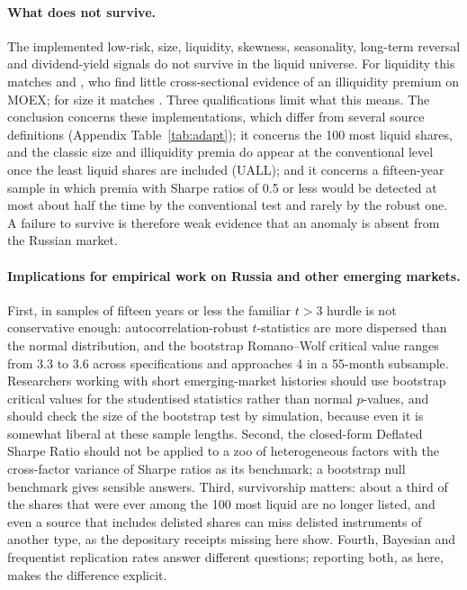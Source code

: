 \documentclass[11pt]{article}
\newcommand{\RW}{Romano--Wolf}
\begin{document}
\paragraph{What does not survive.} The implemented low-risk, size, liquidity, skewness, seasonality, long-term reversal
and dividend-yield signals do not survive in the liquid universe. For liquidity this matches \citet{teplova2022implicit}
and \citet{gurov2023illiquidity}, who find little cross-sectional evidence of an illiquidity premium on MOEX; for size it
matches \citet{ovechkin2022econometric}. Three qualifications limit what this means. The conclusion concerns these
implementations, which differ from several source definitions (Appendix Table~\ref{tab:adapt}); it concerns the 100 most
liquid shares, and the classic size and illiquidity premia do appear at the conventional level once the least liquid
shares are included (UALL); and it concerns a fifteen-year sample in which premia with Sharpe ratios of 0.5 or less would
be detected at most about half the time by the conventional test and rarely by the robust one. A failure to survive is
therefore weak evidence that an anomaly is absent from the Russian market.

\paragraph{Implications for empirical work on Russia and other emerging markets.} First, in samples of fifteen years
or less the familiar $t>3$ hurdle is not conservative enough: autocorrelation-robust $t$-statistics are more dispersed
than the normal distribution, and the bootstrap \RW{} critical value ranges from 3.3 to 3.6 across specifications and
approaches 4 in a 55-month subsample. Researchers working with short emerging-market histories should use bootstrap
critical values for the studentised statistics rather than normal $p$-values, and should check the size of the
bootstrap test by simulation, because even it is somewhat liberal at these sample lengths. Second, the closed-form Deflated Sharpe
Ratio should not be applied to a zoo of heterogeneous factors with the cross-factor variance of Sharpe ratios as its
benchmark; a bootstrap null benchmark gives sensible answers. Third, survivorship matters: about a third of the
shares that were ever among the 100 most liquid are no longer listed, and even a source that includes delisted shares can miss
delisted instruments of another type, as the depositary receipts missing here show. Fourth, Bayesian and frequentist replication
rates answer different questions; reporting both, as here, makes the difference explicit.
\end{document}
